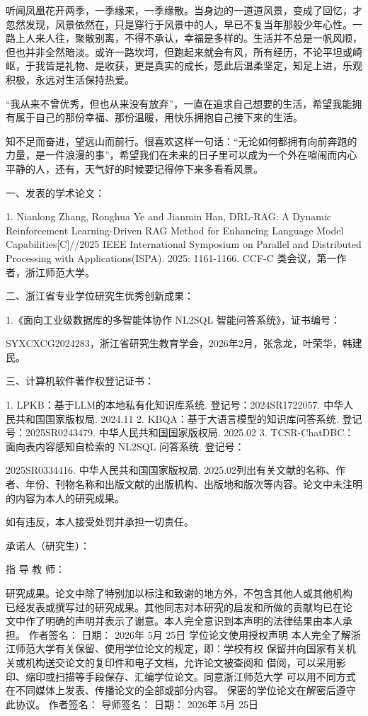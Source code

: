 \documentclass[12pt,a4paper,openright,UTF8]{ctexbook}
\begin{document}
听闻凤凰花开两季，一季缘来，一季缘散。当身边的一道道风景，变成了回忆，才忽然发现，风景依然在，只是穿行于风景中的人，早已不复当年那般少年心性。一路上人来人往，聚散别离，不得不承认，幸福是多样的。生活并不总是一帆风顺，但也并非全然暗淡。或许一路坎坷，但跑起来就会有风，所有经历，不论平坦或崎岖，于我皆是礼物、是收获，更是真实的成长，愿此后温柔坚定，知足上进，乐观积极，永远对生活保持热爱。


“我从来不曾优秀，但也从来没有放弃”，一直在追求自己想要的生活，希望我能拥有属于自己的那份幸福、那份温暖，用快乐拥抱自己接下来的生活。


知不足而奋进，望远山而前行。很喜欢这样一句话：“无论如何都拥有向前奔跑的力量，是一件浪漫的事”，希望我们在未来的日子里可以成为一个外在喧闹而内心平静的人，还有，天气好的时候要记得停下来多看看风景。


一、发表的学术论文：


1. Nianlong Zhang, Ronghua Ye and Jianmin Han, DRL-RAG: A Dynamic Reinforcement Learning-Driven RAG Method for Enhancing Language Model Capabilities[C]//2025 IEEE International Symposium on Parallel and Distributed Processing with Applications(ISPA). 2025: 1161-1166. CCF-C 类会议，第一作者，浙江师范大学。


二、浙江省专业学位研究生优秀创新成果：


1.《面向工业级数据库的多智能体协作 NL2SQL 智能问答系统》，证书编号：


SYXCXCG2024283，浙江省研究生教育学会，2026年2月，张念龙，叶荣华，韩建民。


三、计算机软件著作权登记证书：


1. LPKB：基于LLM的本地私有化知识库系统. 登记号：2024SR1722057. 中华人民共和国国家版权局. 2024.11 2. KBQA：基于大语言模型的知识库问答系统. 登记号：2025SR0243479. 中华人民共和国国家版权局. 2025.02 3. TCSR-ChatDBC：面向表内容感知自检索的 NL2SQL 问答系统. 登记号：


2025SR0334416. 中华人民共和国国家版权局. 2025.02列出有关文献的名称、作者、年份、刊物名称和出版文献的出版机构、出版地和版次等内容。论文中未注明的内容为本人的研究成果。


如有违反，本人接受处罚并承担一切责任。


承诺人（研究生）：


指 导 教 师：


研究成果。论文中除了特别加以标注和致谢的地方外，不包含其他人或其他机构
已经发表或撰写过的研究成果。其他同志对本研究的启发和所做的贡献均已在论
文中作了明确的声明并表示了谢意。本人完全意识到本声明的法律结果由本人承
担。
作者签名： 日期： 2026年 5月 25日
学位论文使用授权声明
本人完全了解浙江师范大学有关保留、使用学位论文的规定，即：学校有权
保留并向国家有关机关或机构送交论文的复印件和电子文档，允许论文被查阅和
借阅，可以采用影印、缩印或扫描等手段保存、汇编学位论文。同意浙江师范大学
可以用不同方式在不同媒体上发表、传播论文的全部或部分内容。
保密的学位论文在解密后遵守此协议。
作者签名： 导师签名： 日期： 2026年 5月 25日
\end{document}
